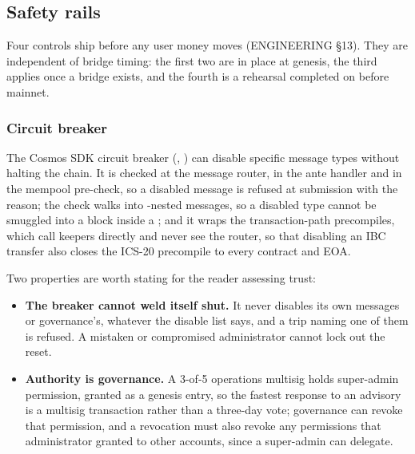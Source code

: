 
\subsection{Safety rails}
\label{sec:rails}

Four controls ship before any user money moves (ENGINEERING \S13). They are
independent of bridge timing: the first two are in place at genesis, the
third applies once a bridge exists, and the fourth is a rehearsal completed
on  before mainnet.

\subsubsection{Circuit breaker}
\label{sec:circuit}

The Cosmos SDK circuit breaker (, ) can
disable specific message types without halting the chain. It is checked at the
message router, in the ante handler and in the mempool pre-check, so a disabled
message is refused at submission with the reason; the check walks into
-nested messages, so a disabled type cannot be smuggled into a
block inside a ; and it wraps the transaction-path precompiles,
which call keepers directly and never see the router, so that disabling an
IBC transfer also closes the ICS-20 precompile to every contract and EOA.

Two properties are worth stating for the reader assessing trust:

\begin{itemize}
\item \textbf{The breaker cannot weld itself shut.} It never disables its own
  messages or governance's, whatever the disable list says, and a trip naming
  one of them is refused. A mistaken or compromised administrator cannot lock
  out the reset.
\item \textbf{Authority is governance.} A 3-of-5 operations multisig holds
  super-admin permission, granted as a genesis entry, so the fastest response to
  an advisory is a multisig transaction rather than a three-day vote; governance
  can revoke that permission, and a revocation must also revoke any permissions
  that administrator granted to other accounts, since a super-admin can
  delegate. 
\end{itemize}

